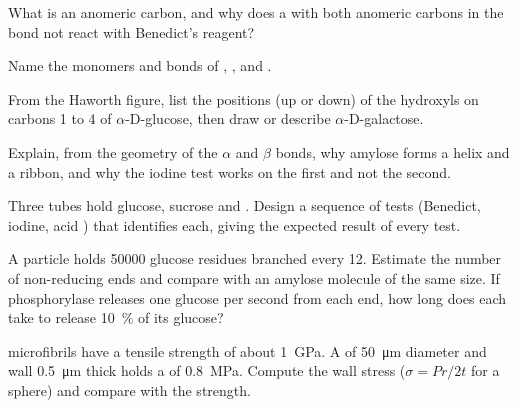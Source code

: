 \begin{exercise}[$\star$]\label{exo:b1:carbohydrates:2}
What is an anomeric carbon, and why does a  with both
anomeric carbons in the bond not react with Benedict's reagent?
\end{exercise}

\begin{exercise}[$\star$]\label{exo:b1:carbohydrates:3}
Name the monomers and bonds of , ,  and .
\end{exercise}

\begin{exercise}[$\star$]\label{exo:b1:carbohydrates:4}
From the Haworth figure, list the positions (up or down) of the
hydroxyls on carbons 1 to 4 of $\alpha$-D-glucose, then draw or
describe $\alpha$-D-galactose.
\end{exercise}

\begin{exercise}[$\star\star$]\label{exo:b1:carbohydrates:5}
Explain, from the geometry of the $\alpha$ and $\beta$ bonds, why
amylose forms a helix and  a ribbon, and why the iodine test
works on the first and not the second.
\end{exercise}

\begin{exercise}[$\star\star$]\label{exo:b1:carbohydrates:6}
Three tubes hold glucose, sucrose and . Design a sequence of
tests (Benedict, iodine, acid ) that identifies each, giving
the expected result of every test.
\end{exercise}

\begin{exercise}[$\star\star$]\label{exo:b1:carbohydrates:7}
A  particle holds \num{50000} glucose residues branched every
12. Estimate the number of non-reducing ends and compare with an
amylose molecule of the same size. If phosphorylase releases one
glucose per second from each end, how long does each take to release
\qty{10}{\%} of its glucose?
\end{exercise}

\begin{exercise}[$\star\star$]\label{exo:b1:carbohydrates:8}
 microfibrils have a tensile strength of about \qty{1}{GPa}.
A  of \qty{50}{\micro m} diameter and wall \qty{0.5}{\micro m}
thick holds a  of \qty{0.8}{MPa}. Compute the wall stress
($\sigma = Pr/2t$ for a sphere) and compare with the strength.
\end{exercise}

